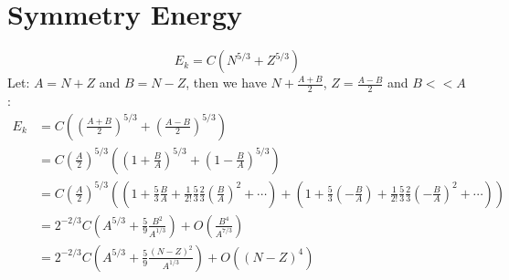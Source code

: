 \chapter{Symmetry Energy}
\label{ap:symmetry_energy}
$$ E_k = C(N^{5/3} + Z^{5/3}) $$
Let: $A = N + Z$ and $B = N - Z$, then we have $N + \frac{A+B}{2}$, 
$Z = \frac{A-B}{2}$ and $B << A$:
\begin{equation*}
    \begin{aligned}
	E_k &= C\left( \left( \frac{A+B}{2}\right)^{5/3} + \left(\frac{A-B}{2} \right)^{5/3} \right)	\\
	    &= C\left(\frac{A}{2}\right)^{5/3} \left( \left( 1 + \frac{B}{A} \right)^{5/3} + \left(1 - \frac{B}{A} \right)^{5/3} \right)   \\
	    &= C\left(\frac{A}{2}\right)^{5/3} \left( \left(1 + \frac{5}{3}\frac{B}{A} + \frac{1}{2!}\frac{5}{3}\frac{2}{3} \left( \frac{B}{A} \right)^2 + \cdots \right) 
		+ \left(1 + \frac{5}{3}\left(-\frac{B}{A} \right) + \frac{1}{2!}\frac{5}{3}\frac{2}{3} \left( -\frac{B}{A} \right)^2 + \cdots \right) \right) \\
	    &= 2^{-2/3}C\left( A^{5/3} + \frac{5}{9}\frac{B^2}{A^{1/3}} \right) + O(\frac{B^4}{A^{7/3}})	\\
	    &= 2^{-2/3}C\left( A^{5/3} + \frac{5}{9}\frac{(N-Z)^2}{A^{1/3}} \right) + O((N-Z)^4)	\\
    \end{aligned}
\end{equation*}


